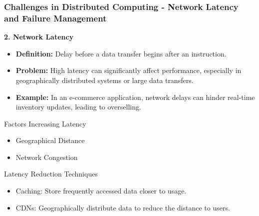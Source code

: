 \documentclass[aspectratio=169]{beamer}
\begin{document}
\begin{frame}[fragile]
    \frametitle{Challenges in Distributed Computing - Network Latency and Failure Management}

    \textbf{2. Network Latency}

    \begin{itemize}
        \item \textbf{Definition:} Delay before a data transfer begins after an instruction.
        
        \item \textbf{Problem:} High latency can significantly affect performance, especially in geographically distributed systems or large data transfers.
        
        \item \textbf{Example:} In an e-commerce application, network delays can hinder real-time inventory updates, leading to overselling.
    \end{itemize}

    \begin{block}{Factors Increasing Latency}
        \begin{itemize}
            \item Geographical Distance
            \item Network Congestion
        \end{itemize}
    \end{block}

    \begin{block}{Latency Reduction Techniques}
        \begin{itemize}
            \item Caching: Store frequently accessed data closer to usage.
            \item CDNs: Geographically distribute data to reduce the distance to users.
        \end{itemize}
    \end{block}
\end{frame}
\end{document}
